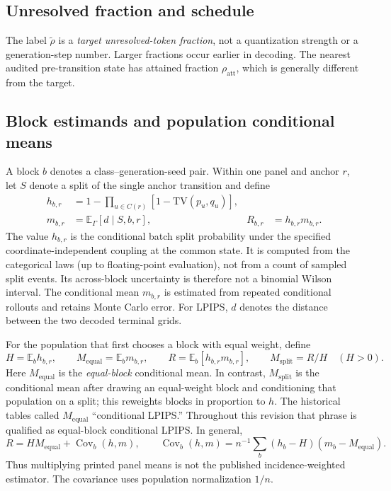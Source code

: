 \documentclass[11pt,a4paper]{article}
\theoremstyle{plain}
\theoremstyle{definition}
\theoremstyle{remark}
\newcommand{\TV}{\mathrm{TV}}
\newcommand{\Ex}{\mathbb{E}}
\newcommand{\rholabel}{\widetilde{\rho}}
\newcommand{\rhoatt}{\rho_{\mathrm{att}}}
\newcommand{\Meq}{M_{\mathrm{equal}}}
\newcommand{\Msplit}{M_{\mathrm{split}}}
\newcommand{\revisiongenerated}{../../generated/v1.0.1}
\begin{document}
\subsection{Unresolved fraction and schedule}
\label{sec:rho}
The label $\rholabel$ is a \emph{target unresolved-token fraction}, not a
quantization strength or a generation-step number. Larger fractions occur
earlier in decoding. The nearest audited pre-transition state has attained
fraction $\rhoatt$, which is generally different from the target.
\begin{table}[tb]
\centering\small
\caption{Frozen 32-step, $16\times16$ Halton schedule. Transition numbers are
one-indexed. The target $0.1$ anchor is the final flush of 41 remaining tokens.}
\label{tab:anchors}

\end{table}

\subsection{Block estimands and population conditional means}
\label{sec:aggregation}
A block $b$ denotes a class--generation-seed pair. Within one panel and anchor
$r$, let $S$ denote a split of the single anchor transition and define
\begin{align}
 h_{b,r}&=1-\prod_{u\in C(r)}[1-\TV(p_u,q_u)],\label{eq:incidence}\\
 m_{b,r}&=\Ex_\Gamma[d\mid S,b,r], & R_{b,r}&=h_{b,r}m_{b,r}.
\end{align}
The value $h_{b,r}$ is the conditional batch split probability under the specified
coordinate-independent coupling at the common state. It is computed from the
categorical laws (up to floating-point evaluation), not from a count of sampled
split events. Its across-block
uncertainty is therefore not a binomial Wilson interval. The conditional mean
$m_{b,r}$ is estimated from repeated conditional rollouts and retains Monte Carlo
error. For LPIPS, $d$ denotes the distance between the two decoded terminal grids.

For the population that first chooses a block with equal weight, define
\begin{equation}
 H=\Ex_b h_{b,r},\qquad \Meq=\Ex_b m_{b,r},\qquad
 R=\Ex_b[h_{b,r}m_{b,r}],\qquad \Msplit=R/H\quad(H>0).
 \label{eq:aggregates}
\end{equation}
Here $\Meq$ is the \emph{equal-block} conditional mean. In contrast, $\Msplit$
is the conditional mean after drawing an equal-weight block and conditioning
that population on a split; this reweights blocks in proportion to $h$.
The historical tables called $\Meq$ ``conditional LPIPS.'' Throughout this
revision that phrase is qualified as equal-block conditional LPIPS.
In general,
\begin{equation}
 R=H\Meq+\operatorname{Cov}_b(h,m),\qquad
 \operatorname{Cov}_b(h,m)=n^{-1}\sum_b(h_b-H)(m_b-\Meq).
 \label{eq:covariance}
\end{equation}
Thus multiplying printed panel means is not the published incidence-weighted
estimator. The covariance uses population normalization $1/n$.
\end{document}
